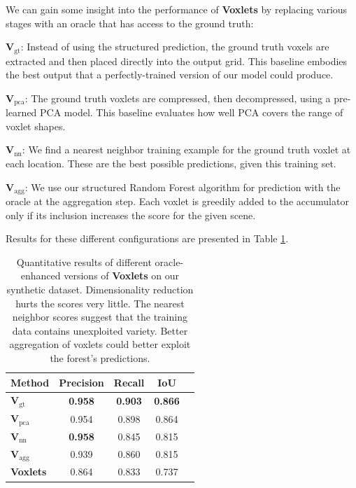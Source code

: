 \documentclass[10pt,twocolumn,letterpaper]{article}
\begin{document}
We can gain some insight into the performance of {\bf Voxlets} by replacing various stages with an oracle that has access to the ground truth:

\noindent\textbf{V}$_\text{gt}$: Instead of using the structured prediction, the ground truth voxels are extracted and then placed directly into the output grid. This baseline embodies the best output that a perfectly-trained version of our model could produce. %

\noindent\textbf{V}$_\text{pca}$: The ground truth voxlets are compressed, then decompressed, using a pre-learned PCA model. This baseline evaluates how well PCA covers the range of voxlet shapes.

\noindent\textbf{V}$_\text{nn}$: We find a nearest neighbor training example for the ground truth voxlet at each location. These are the best possible predictions, given this training set. %

\noindent\textbf{V}$_\text{agg}$: We use our structured Random Forest algorithm for prediction with the oracle at the aggregation step. Each voxlet is greedily added to the accumulator only if its inclusion increases the score for the given scene.

Results for these different configurations are presented in Table \ref{tab:oracle_results}.

\begin{table}
  \centering
  \begin{tabular}{|p{2.2cm}|c|c|c|c|}
  \hline
  \textbf{Method}  &   \textbf{Precision} & \textbf{Recall} & \textbf{IoU}\\
  \hline
   \textbf{V}$_\text{gt}$ & {\bf 0.958} & {\bf 0.903} & {\bf 0.866} \\
  \textbf{V}$_\text{pca}$ & 0.954  & 0.898 & 0.864 \\
  \textbf{V}$_\text{nn}$ & {\bf 0.958} & 0.845 & 0.815 \\
  \textbf{V}$_\text{agg}$ & 0.939 & 0.860 & 0.815 \\
  \hline
  {\bf Voxlets} & 0.864 & 0.833 & 0.737 \\
  \hline
  \end{tabular}
  \vspace{5pt}
  \caption{Quantitative results of different oracle-enhanced versions of {\bf Voxlets} on our synthetic dataset. Dimensionality reduction hurts the scores very little. The nearest neighbor scores suggest that the training data contains unexploited variety. Better aggregation of voxlets could better exploit the forest's predictions.}
  \vspace{-5pt}
    \label{tab:oracle_results}
\end{table}
\end{document}
